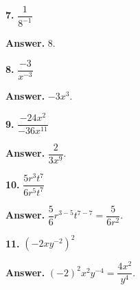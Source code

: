 \documentclass{ximera}
\begin{document}
\begin{problem}

\textbf{7.} $\dfrac{1}{8^{-1}}$ \qquad

\begin{hint}
\textbf{Answer.} $8$.
\end{hint}
\end{problem}

\begin{problem}

\textbf{8.} $\dfrac{-3}{x^{-3}}$ \qquad

\begin{hint}
\textbf{Answer.} $-3x^{3}$.
\end{hint}
\end{problem}

\begin{problem}

\textbf{9.} $\dfrac{-24x^{2}}{-36x^{11}}$ \qquad

\begin{hint}
\textbf{Answer.}
$\dfrac{2}{3x^{9}}$.
\end{hint}
\end{problem}

\begin{problem}

\textbf{10.} $\dfrac{5r^{3}t^{7}}{6r^{5}t^{7}}$ \qquad

\begin{hint}
\textbf{Answer.}
$\dfrac{5}{6}r^{3-5}t^{7-7}=\dfrac{5}{6r^{2}}$.
\end{hint}
\end{problem}

\begin{problem}

\textbf{11.} $\left(-2xy^{-2}\right)^{2}$ \qquad

\begin{hint}
\textbf{Answer.}
$(-2)^{2}x^{2}y^{-4}=\dfrac{4x^{2}}{y^{4}}$.
\end{hint}
\end{problem}
\end{document}
